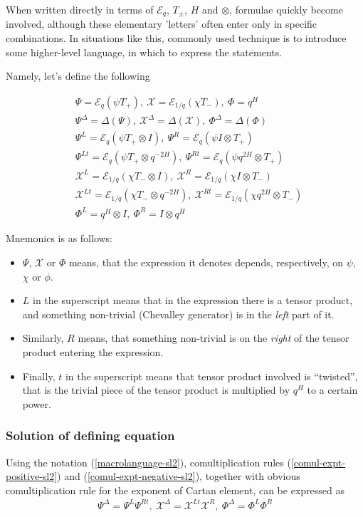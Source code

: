 \documentclass{article}
\newcommand{\lb}{\left (}
\newcommand{\rb}{\right )}
\newcommand{\B}[1]{\lb #1 \rb}
\newcommand{\be}{\begin{eqnarray}}
\newcommand{\ee}{\end{eqnarray}}
\newcommand {\?}{\textit{???}}
\newcommand{\me}[0]{\mathcal{E}}
\newcommand{\Tp}[1][]{T_{+ #1}}
\newcommand{\Tm}[1][]{T_{- #1}}
\def\Chi{\mathcal{X}}
\newcommand{\EChiL}[1][]{\Chi^L_{#1}}
\newcommand{\EChiR}[1][]{\Chi^R_{#1}}
\newcommand{\EChiLT}[1][]{\Chi^{Lt}_{#1}}
\newcommand{\EChiRT}[1][]{\Chi^{Rt}_{#1}}
\newcommand{\EChiD}[1][]{\Chi^\Delta_{#1}}
\newcommand{\EPsiL}[1][]{\Psi^L_{#1}}
\newcommand{\EPsiR}[1][]{\Psi^R_{#1}}
\newcommand{\EPsiLT}[1][]{\Psi^{Lt}_{#1}}
\newcommand{\EPsiRT}[1][]{\Psi^{Rt}_{#1}}
\newcommand{\EPsiD}[1][]{\Psi^\Delta_{#1}}
\newcommand{\QPhiL}[1][]{\Phi^L_{#1}}
\newcommand{\QPhiR}[1][]{\Phi^R_{#1}}
\newcommand{\QPhiD}[1][]{\Phi^\Delta_{#1}}
\newcommand{\comul}[1]{\Delta \lb #1 \rb}
\newcommand{\delabel}[1]{(\ref{#1})}
\begin{document}
When written directly in terms of $\me_q$, $T_\pm$, $H$ and $\otimes$, formulae quickly become involved,
although these elementary 'letters' often enter only in specific combinations.
In situations like this, commonly used technique is to introduce some higher-level language,
in which to express the statements.

Namely, let's define the following

\be
& \Psi = \me_q \B{\psi \Tp},\ \Chi = \me_{1/q} \B{\chi \Tm},\ \Phi = q^H \nonumber \\
& \EPsiD = \comul{\Psi},\ \EChiD = \comul{\Chi},\ \QPhiD = \comul{\Phi} \nonumber \\
& \EPsiL = \me_q \lb \psi T_+ \otimes I\rb,\ \EPsiR = \me_q \lb \psi I \otimes T_+ \rb \nonumber \\
\label{macrolanguage-sl2}
& \EPsiLT = \me_q \lb \psi T_+ \otimes q^{-2H}\rb,\ \EPsiRT = \me_q \lb \psi q^{2H} \otimes T_+ \rb \\
& \EChiL = \me_{1/q} \lb \chi T_- \otimes I\rb,\ \EChiR = \me_{1/q} \lb \chi I \otimes T_- \rb \nonumber \\
& \EChiLT = \me_{1/q} \lb \chi T_- \otimes q^{-2H}\rb,\ \EChiRT = \me_{1/q} \lb \chi q^{2H} \otimes T_- \rb \nonumber \\
& \QPhiL = q^H \otimes I,\ \QPhiR = I \otimes q^H \nonumber 
\ee

Mnemonics is as follows:
\begin{itemize}
\item $\Psi$, $\Chi$ or $\Phi$ means, that the expression it denotes depends, respectively,
on $\psi$, $\chi$ or $\phi$.
\item $L$ in the superscript means that in the expression there is a tensor product,
and something non-trivial (Chevalley generator) is in the {\it left} part of it.
\item Similarly, $R$ means, that something non-trivial is on the {\it right} of the tensor product entering the expression.
\item Finally, $t$ in the superscript means that tensor product involved is ``twisted'', that is the trivial piece
of the tensor product is multiplied by $q^H$ to a certain power.
\end{itemize}

\subsubsection{Solution of defining equation}

Using the notation \delabel{macrolanguage-sl2}, comultiplication rules \delabel{comul-expt-positive-sl2} and
\delabel{comul-expt-negative-sl2}, together with obvious comultiplication rule for the exponent of Cartan element,
can be expressed as
\be
\EPsiD = \EPsiL \EPsiRT,\ \EChiD = \EChiLT \EChiR,\ \QPhiD = \QPhiL \QPhiR
\ee
\end{document}
